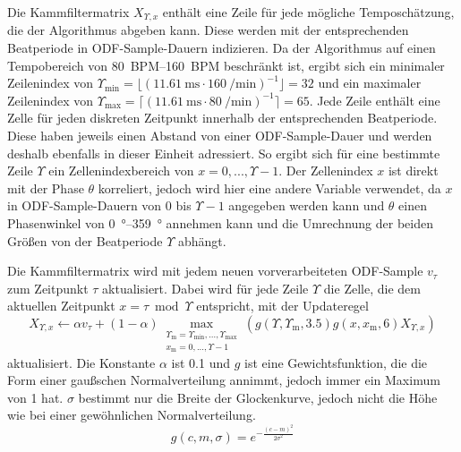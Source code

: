 {{{			%
			Die Kammfiltermatrix $X_{\Upsilon, x}$ enthält eine Zeile für jede mögliche Temposchätzung, die der Algorithmus abgeben kann.
			Diese werden mit der entsprechenden Beatperiode in ODF-Sample-Dauern indizieren.
			Da der Algorithmus auf einen Tempobereich von \SIrange{80}{160}{BPM} beschränkt ist,
				ergibt sich ein minimaler Zeilenindex von
				$\Upsilon_{\text{min}} = \lfloor(\SI{11.61}{\milli\second} \cdot \SI{160}{\per\minute})^{-1}\rfloor = 32$
				und ein maximaler Zeilenindex von
				$\Upsilon_{\text{max}} = \lceil(\SI{11.61}{\milli\second} \cdot \SI{80}{\per\minute})^{-1}\rceil = 65$.
			Jede Zeile enthält eine Zelle für jeden diskreten Zeitpunkt innerhalb der entsprechenden Beatperiode.
			Diese haben jeweils einen Abstand von einer ODF-Sample-Dauer
				und werden deshalb ebenfalls in dieser Einheit adressiert.
			So ergibt sich für eine bestimmte Zeile $\Upsilon$ ein Zellenindexbereich von $x = 0, ..., \Upsilon - 1$.
			Der Zellenindex $x$ ist direkt mit der Phase $\theta$ korreliert,
				jedoch wird hier eine andere Variable verwendet,
				da $x$ in ODF-Sample-Dauern von $0$ bis $\Upsilon - 1$ angegeben werden kann
				und $\theta$ einen Phasenwinkel von \SIrange{0}{359}{\degree} annehmen kann
				und die Umrechnung der beiden Grö{\ss}en von der Beatperiode $\Upsilon$ abhängt.

			Die Kammfiltermatrix wird mit jedem neuen vorverarbeiteten ODF-Sample $v_\tau$ zum Zeitpunkt $\tau$ aktualisiert.
			Dabei wird für jede Zeile $\Upsilon$ die Zelle,
				die dem aktuellen Zeitpunkt $x = \tau \bmod \Upsilon$ entspricht,
				mit der Updateregel
				\begin{equation}
					X_{\Upsilon, x} \leftarrow
						\alpha v_\tau +
						(1 - \alpha) \max_{
							\substack{
								\Upsilon_\text{m} = \Upsilon_{\text{min}}, ..., \Upsilon_{\text{max}} \\
								x_\text{m} = 0, ..., \Upsilon - 1
							}
						}
						(g(\Upsilon, \Upsilon_\text{m}, 3.5) g(x, x_\text{m}, 6) X_{\Upsilon, x})
				\end{equation}
				aktualisiert.
			Die Konstante $\alpha$ ist \num{0.1}
				und $g$ ist eine Gewichtsfunktion,
				die die Form einer gau{\ss}schen Normalverteilung annimmt,
				jedoch immer ein Maximum von \num{1} hat.
			$\sigma$ bestimmt nur die Breite der Glockenkurve,
				jedoch nicht die Höhe wie bei einer gewöhnlichen Normalverteilung.
			\begin{equation}
				g(c, m, \sigma) = e^{-\frac{(c - m)^2}{2\sigma^2}}
			\end{equation}

}}}

